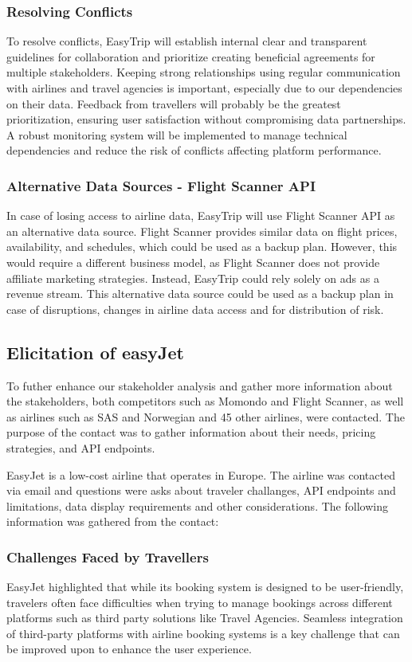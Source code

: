 \subsubsection{Resolving Conflicts}
To resolve conflicts, EasyTrip will establish internal clear and transparent guidelines for collaboration and prioritize creating beneficial agreements for multiple stakeholders. Keeping strong relationships using regular communication with airlines and travel agencies is important, especially due to our dependencies on their data. Feedback from travellers will probably be the greatest prioritization, ensuring user satisfaction without compromising data partnerships. A robust monitoring system will be implemented to manage technical dependencies and reduce the risk of conflicts affecting platform performance.

\subsubsection{Alternative Data Sources - Flight Scanner API}
In case of losing access to airline data, EasyTrip will use Flight Scanner API as an alternative data source. Flight Scanner provides similar data on flight prices, availability, and schedules, which could be used as a backup plan. However, this would require a different business model, as Flight Scanner does not provide affiliate marketing strategies. Instead, EasyTrip could rely solely on ads as a revenue stream. This alternative data source could be used as a backup plan in case of disruptions, changes in airline data access and for distribution of risk.
\subsection{Elicitation of easyJet}
To futher enhance our stakeholder analysis and gather more information about the stakeholders, both competitors such as Momondo and Flight Scanner, as well as airlines such as SAS and Norwegian and 45 other airlines, were contacted. The purpose of the contact was to gather information about their needs, pricing strategies, and API endpoints. 

EasyJet is a low-cost airline that operates in Europe. The airline was contacted via email and questions were asks about traveler challanges, API endpoints and limitations, data display requirements and other considerations. The following information was gathered from the contact:
\subsubsection{Challenges Faced by Travellers}
EasyJet highlighted that while its booking system is designed to be user-friendly, travelers often face difficulties when trying to manage bookings across different platforms such as third party solutions like Travel Agencies. Seamless integration of third-party platforms with airline booking systems is a key challenge that can be improved upon to enhance the user experience.

